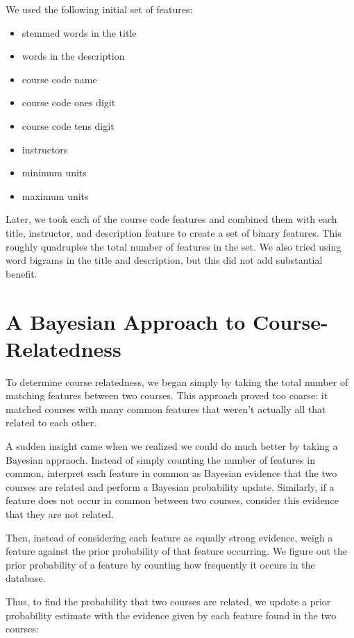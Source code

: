 \documentclass[12pt]{article}
\begin{document}
We used the following initial set of features: 

\begin{itemize}
\item stemmed words in the title
\item words in the description
\item course code name
\item course code ones digit
\item course code tens digit
\item instructors
\item minimum units
\item maximum units
\end{itemize}  

Later, we took each of the course code features and combined them with
each title, instructor, and description feature to create a set of
binary features. This roughly quadruples the total number of features
in the set. We also tried using word bigrams in the title and
description, but this did not add substantial benefit.

\section*{A Bayesian Approach to Course-Relatedness}

To determine course relatedness, we began simply by taking the total
number of matching features between two courses. This approach proved
too coarse: it matched courses with many common features that weren't
actually all that related to each other.

A sudden insight came when we realized we could do much better by
taking a Bayesian appraoch. Instead of simply counting the number of
features in common, interpret each feature in common as Bayesian
evidence that the two courses are related and perform a Bayesian
probability update. Similarly, if a feature does not occur in common
between two courses, consider this evidence that they are not related.

Then, instead of considering each feature as equally strong evidence,
weigh a feature against the prior probability of that feature
occurring. We figure out the prior probability of a feature by
counting how frequently it occurs in the database.

Thus, to find the probability that two courses are related, we update
a prior probability estimate with the evidence given by each feature
found in the two courses: \\
\end{document}
